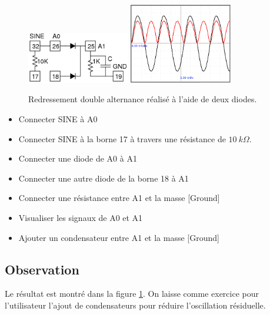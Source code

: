 \documentclass{book}
\begin{document}
\begin{figure}[h!]
\begin{center}
\caption{\label{fig:Diode-fullwave-rectifier}Redressement double alternance réalisé à l'aide de deux diodes. }\vspace{0.5em}
\includegraphics[width=0.4\textwidth, height=0.3\textwidth, keepaspectratio]{Schematic-full-wave.png}
\includegraphics[width=0.4\textwidth, height=0.3\textwidth, keepaspectratio]{Pic-diode-fullwave.png}
\end{center}
\end{figure}



\begin{itemize}
  \item Connecter SINE à A0
  \item Connecter SINE à la borne 17 à travers une résistance de $10\ k\Omega$.
  \item Connecter une diode de A0 à A1
  \item Connecter une autre diode de la borne 18 à A1
  \item Connecter une résistance entre A1 et la masse [Ground]
  \item Visualiser les signaux de A0 et A1
  \item Ajouter un condensateur entre A1 et la masse [Ground]
\end{itemize}

\subsection{Observation}


Le résultat est montré dans la figure  \ref{fig:Diode-fullwave-rectifier}. On laisse comme exercice pour l'utilisateur l'ajout de condensateurs pour réduire l'oscillation résiduelle.
\end{document}
